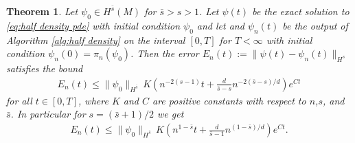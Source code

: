\documentclass[12pt]{amsart}
\newtheorem{thm}{Theorem}[section]
\begin{document}
\begin{thm} \label{thm:half density convergence}
	Let $\psi_{0} \in H^{\bar{s}}(M)$ for $\bar{s} > s > 1$.
	Let $\psi(t)$ be the exact solution to \eqref{eq:half density pde} with initial condition $\psi_{0}$ and let
	and $\psi_{n}(t)$ be the output of Algorithm \ref{alg:half density} on the interval $[0,T]$ for $T < \infty$ with initial condition $\psi_{n}(0) = \pi_{n}(\psi_{0})$.
	Then the error $E_{n}(t) := \| \psi(t) - \psi_{n}(t) \|_{H^{s}}$ satisfies the bound
	\begin{align}
		E_{n}(t) \leq \| \psi_{0} \|_{H^{\bar{s}}} \, K \left( n^{-2(s-1)} t+  \frac{d}{\bar{s}-s} n^{-2(\bar{s}-s)/d} \right) e^{C t}
	\end{align}
	for all $t \in [0,T]$, where $K$ and $C$ are positive constants with respect to $n$,$s$, and $\bar{s}$.
	In particular for $s = (\bar{s}+1)/2$ we get
	\begin{align}
			E_{n}(t) \leq \| \psi_{0} \|_{H^{\bar{s}}} \, K \left( n^{1-\bar{s}} t+  \frac{d}{\bar{s}-1} n^{(1-\bar{s})/d} \right) e^{C t}.
	\end{align}
\end{thm}
\end{document}

